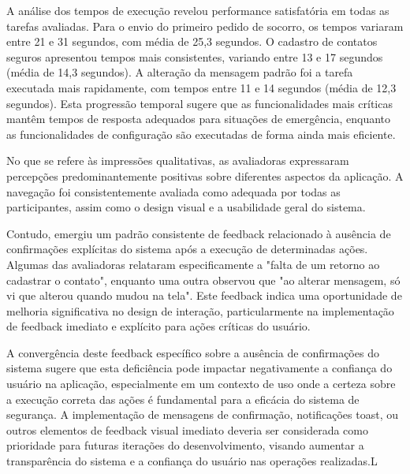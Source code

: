 A análise dos tempos de execução revelou performance satisfatória em todas as tarefas avaliadas. Para o envio do primeiro pedido de socorro, os tempos variaram entre 21 e 31 segundos, com média de 25,3 segundos. O cadastro de contatos seguros apresentou tempos mais consistentes, variando entre 13 e 17 segundos (média de 14,3 segundos). A alteração da mensagem padrão foi a tarefa executada mais rapidamente, com tempos entre 11 e 14 segundos (média de 12,3 segundos). Esta progressão temporal sugere que as funcionalidades mais críticas mantêm tempos de resposta adequados para situações de emergência, enquanto as funcionalidades de configuração são executadas de forma ainda mais eficiente.

No que se refere às impressões qualitativas, as avaliadoras expressaram percepções predominantemente positivas sobre diferentes aspectos da aplicação. A navegação foi consistentemente avaliada como adequada por todas as participantes, assim como o design visual e a usabilidade geral do sistema.
\begin{comment}
	Mônica Abreu destacou especificamente que "a interface é muito fácil e simples de aprender a utilizar", enquanto Wannielly Barbosa elogiou a "navegação fluida e sem problema para mudar de tela", caracterizando ainda a iniciativa como "ótima para mulheres".
\end{comment}

Contudo, emergiu um padrão consistente de feedback relacionado à ausência de confirmações explícitas do sistema após a execução de determinadas ações. Algumas das avaliadoras relataram especificamente a "falta de um retorno ao cadastrar o contato", enquanto uma outra observou que "ao alterar mensagem, só vi que alterou quando mudou na tela". Este feedback indica uma oportunidade de melhoria significativa no design de interação, particularmente na implementação de feedback imediato e explícito para ações críticas do usuário.

A convergência deste feedback específico sobre a ausência de confirmações do sistema sugere que esta deficiência pode impactar negativamente a confiança do usuário na aplicação, especialmente em um contexto de uso onde a certeza sobre a execução correta das ações é fundamental para a eficácia do sistema de segurança. A implementação de mensagens de confirmação, notificações toast, ou outros elementos de feedback visual imediato deveria ser considerada como prioridade para futuras iterações do desenvolvimento, visando aumentar a transparência do sistema e a confiança do usuário nas operações realizadas.L